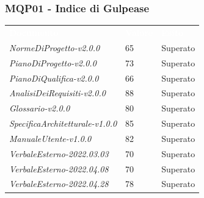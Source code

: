 \subsubsection{MQP01 - Indice di Gulpease}
\begin{table}[H]
        \renewcommand{\arraystretch}{1.5}
        \begin{tabular}{m{}<{\centering}  m{}<{\centering}  m{}<{\centering} }
            \rowcolor{darkblue}
            \textcolor{white}{\textbf{Documento}}& \textcolor{white}{\textbf{Valore}} & \textcolor{white}{\textbf{Esito}}\\ 

            \textit{NormeDiProgetto-v2.0.0} &
            65 &
            Superato \\

            \textit{PianoDiProgetto-v2.0.0} &
            73 &
            Superato \\

            \textit{PianoDiQualifica-v2.0.0} &
            66 &
            Superato \\

            \textit{AnalisiDeiRequisiti-v2.0.0} &
            88 &
            Superato \\
            
            \textit{Glossario-v2.0.0} &
            80 &
            Superato \\
            \textit{SpecificaArchitetturale-v1.0.0} &
            85 &
            Superato \\
            \textit{ManualeUtente-v1.0.0} &
            82 &
            Superato \\

            \textit{VerbaleEsterno-2022.03.03} &
            70 &
            Superato \\
            
            \textit{VerbaleEsterno-2022.04.08} &
            70 &
            Superato \\

            \textit{VerbaleEsterno-2022.04.28} &
            78&
            Superato \\


\end{tabular}
\end{table}
